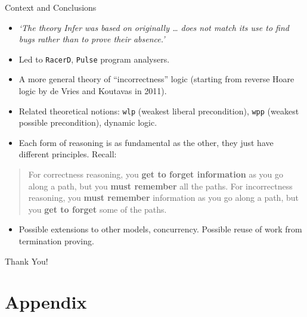 \documentclass[
  10pt,
  ignorenonframetext,
]{beamer}
\providecommand{\tightlist}{%
  \setlength{\itemsep}{0pt}\setlength{\parskip}{0pt}}
\begin{document}
\begin{frame}[fragile]{Context and Conclusions}
\label{context-and-conclusions}
\begin{itemize}
\item
  \emph{`The theory Infer was based on originally \ldots{} does not
  match its use to find bugs rather than to prove their absence.'}
\item
  Led to \texttt{RacerD}, \texttt{Pulse} program analysers.
\item
  A more general theory of ``incorrectness'' logic (starting from
  reverse Hoare logic by de Vries and Koutavas in 2011).
\item
  Related theoretical notions: \texttt{wlp} (weakest liberal
  precondition), \texttt{wpp} (weakest possible precondition), dynamic
  logic.
\item
  Each form of reasoning is as fundamental as the other, they just have
  different principles. Recall:
\end{itemize}

\begin{quote}
For correctness reasoning, you \textbf{get to forget information} as you
go along a path, but you \textbf{must remember} all the paths. For
incorrectness reasoning, you \textbf{must remember} information as you
go along a path, but you \textbf{get to forget} some of the paths.
\end{quote}

\begin{itemize}
\tightlist
\item
  Possible extensions to other models, concurrency. Possible reuse of
  work from termination proving.
\end{itemize}

\begin{center}
    Thank You!
\end{center}
\end{frame}

\section{Appendix}\label{appendix}
\end{document}
